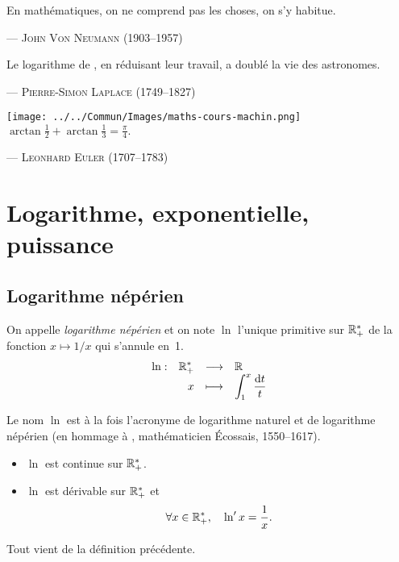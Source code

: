 \documentclass{magnolia}
\begin{document}
\setlength{}
\epigraph{\og En mathématiques, on ne comprend pas les choses, on s’y habitue.\fg}{--- \textsc{John Von Neumann (1903--1957)}}
\setlength{}
\epigraph{\og Le logarithme de , en réduisant leur travail, a doublé la vie des astronomes.\fg}{--- \textsc{Pierre-Simon Laplace (1749--1827)}}
\setlength{}
\epigraph{\texttt{[image: ../../Commun/Images/maths-cours-machin.png]}\\
\og $\arctan\frac{1}{2}+\arctan\frac{1}{3}=\frac{\pi}{4}.$ \fg}{--- \textsc{Leonhard Euler (1707--1783)}}

\magtoc

\section{Logarithme, exponentielle, puissance}
\subsection{Logarithme népérien}
\begin{definition}[utile=-3]
On appelle \emph{logarithme népérien} et on note $\ln$ l'unique primitive sur $\mathbb{R}_+^*$ de la fonction $x\mapsto 1/x$ qui s'annule en~1.
\[\begin{array}[t]{lrcl} \displaystyle{\ln} : & \displaystyle{\mathbb{R}_+^*} & \longrightarrow & \displaystyle{\mathbb{R}} \\ & \displaystyle{x} & \longmapsto & \displaystyle{\int_{1}^{x} \frac{\text{d}t}{t}} \end{array}\]
\end{definition}

\begin{remarqueUnique}
\remarque Le nom $\ln$ est à la fois l'acronyme de logarithme naturel et de
  logarithme népérien (en hommage à , mathématicien Écossais,
  1550--1617).
\end{remarqueUnique}

\begin{proposition}[utile=-3]
\begin{itemize}
\item $\ln$ est continue sur $\mathbb{R}_+^*$.
\item $\ln$ est dérivable sur $\mathbb{R}_+^*$ et
  \[\forall x\in\mathbb{R}_+^* ,\quad \ln' x=\frac{1}{x}.\]
\end{itemize}
\end{proposition}

\begin{preuve}
Tout vient de la définition précédente.
\end{preuve}
\end{document}
